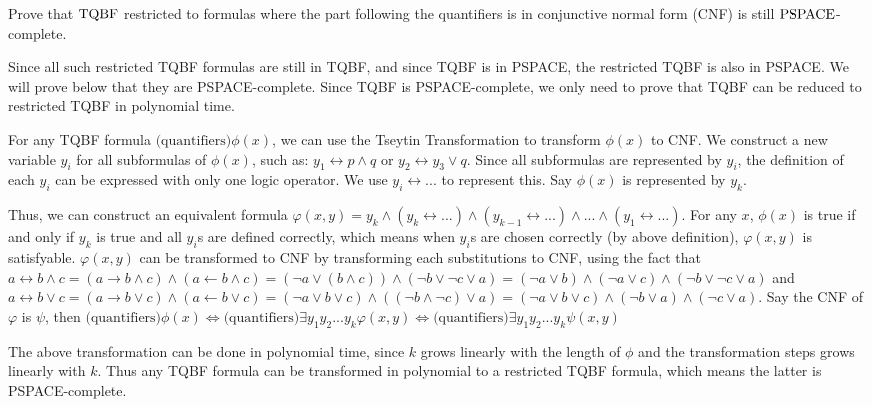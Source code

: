 \documentclass{homework}
\begin{document}



\begin{problem}
  Prove that $\mathrm{TQBF}$ restricted to formulas where the part following the
  quantifiers is in conjunctive normal form (CNF) is still $\textup{PSPACE}$-complete.
\end{problem}

\begin{solution}
  Since all such restricted TQBF formulas are still in TQBF, and since TQBF is in PSPACE, the restricted TQBF is also in PSPACE. We will prove below that they are PSPACE-complete. Since TQBF is PSPACE-complete, we only need to prove that TQBF can be reduced to restricted TQBF in polynomial time.

  For any TQBF formula $\text{(quantifiers)}\phi(x)$, we can use the Tseytin Transformation to transform $\phi(x)$ to CNF. We construct a new variable $y_i$ for all subformulas of $\phi(x)$, such as: $y_1 \leftrightarrow p\land q$ or $y_2 \leftrightarrow y_3 \lor q$. Since all subformulas are represented by $y_i$, the definition of each $y_i$ can be expressed with only one logic operator. We use $y_i\leftrightarrow ...$ to represent this. Say $\phi(x)$ is represented by $y_k$.

  Thus, we can construct an equivalent formula $\varphi(x,y) = y_k\land(y_{k}\leftrightarrow ...)\land(y_{k-1}\leftrightarrow ...)\land ...\land(y_1\leftrightarrow ...)$. For any $x$, $\phi(x)$ is true if and only if $y_k$ is true and all $y_i$s are defined correctly, which means when $y_i$s are chosen correctly (by above definition), $\varphi(x,y)$ is satisfyable. $\varphi(x,y)$ can be transformed to CNF by transforming each substitutions to CNF, using the fact that $a\leftrightarrow b\land c = (a\rightarrow b\land c) \land (a\leftarrow b\land c) = (\neg a \lor (b\land c))\land(\neg b\lor \neg c\lor a) = (\neg a \lor b)\land(\neg a \lor c)\land(\neg b\lor \neg c\lor a)$ and $a\leftrightarrow b\lor c = (a\rightarrow b\lor c) \land (a\leftarrow b\lor c) = (\neg a \lor b\lor c)\land((\neg b\land \neg c)\lor a) = (\neg a \lor b\lor c)\land(\neg b \lor a) \land (\neg c\lor a)$. Say the CNF of $\varphi$ is $\psi$, then $\text{(quantifiers)}\phi(x)\iff \text{(quantifiers)}\exists y_1y_2...y_k\varphi(x,y)\iff \text{(quantifiers)}\exists y_1y_2...y_k\psi(x,y)$

  The above transformation can be done in polynomial time, since $k$ grows linearly with the length of $\phi$ and the transformation steps grows linearly with $k$. Thus any TQBF formula can be transformed in polynomial to a restricted TQBF formula, which means the latter is PSPACE-complete.
\end{solution}
\end{document}
